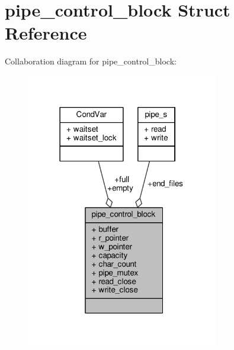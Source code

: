 \hypertarget{structpipe__control__block}{}\section{pipe\+\_\+control\+\_\+block Struct Reference}
\label{structpipe__control__block}


Collaboration diagram for pipe\+\_\+control\+\_\+block\+:\nopagebreak
\begin{figure}[H]
\begin{center}
\leavevmode
\includegraphics[width=237pt]{structpipe__control__block__coll__graph}
\end{center}
\end{figure}
